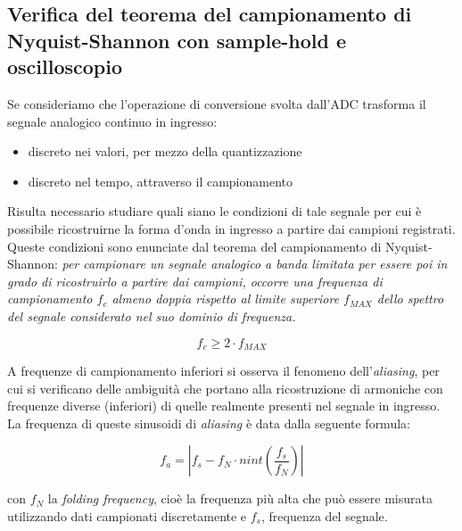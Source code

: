 \documentclass[journal]{IEEEtran}
\begin{document}
\subsection{Verifica del teorema del campionamento di Nyquist-Shannon con sample-hold e oscilloscopio}

Se consideriamo che l'operazione di conversione svolta dall'ADC trasforma il segnale analogico continuo in ingresso:
\begin{itemize}
   \item discreto nei valori, per mezzo della quantizzazione
   \item discreto nel tempo, attraverso il campionamento
\end{itemize}

Risulta necessario studiare quali siano le condizioni di tale segnale per cui è possibile ricostruirne la forma d'onda in ingresso a partire dai campioni registrati. Queste condizioni sono enunciate dal teorema del campionamento di Nyquist-Shannon: \textit{per campionare un segnale analogico a banda limitata per essere poi in grado di ricostruirlo a partire dai campioni, occorre una frequenza di campionamento $f_c$ almeno doppia rispetto al limite superiore $f_{MAX}$ dello spettro del segnale considerato nel suo dominio di frequenza.}

\begin{equation}
    f_c \ge 2 \cdot f_{MAX}
\end{equation}

A frequenze di campionamento inferiori si osserva il fenomeno dell'\textit{aliasing}, per cui si verificano delle ambiguità che portano alla ricostruzione di armoniche con frequenze diverse (inferiori) di quelle realmente presenti nel segnale in ingresso. La frequenza di queste sinusoidi di \textit{aliasing} è data dalla seguente formula:

\begin{equation}
    f_a = |f_s - f_N \cdot nint(\frac{f_s}{f_N})|
\end{equation}

con $f_N$ la \textit{folding frequency}, cioè la frequenza più alta che può essere misurata utilizzando dati campionati discretamente e $f_s$, frequenza del segnale.

\end{document}
